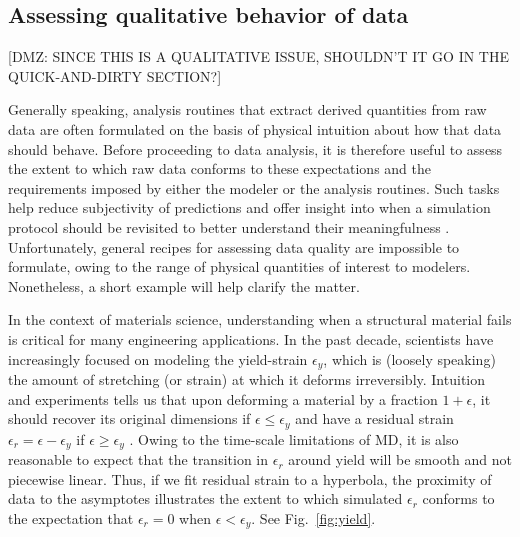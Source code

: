 \subsection{Assessing qualitative behavior of data}

[DMZ: SINCE THIS IS A QUALITATIVE ISSUE, SHOULDN'T IT GO IN THE QUICK-AND-DIRTY SECTION?]

Generally speaking, analysis routines that extract derived quantities from raw data are often formulated on the basis of physical intuition about how that data should behave.  Before proceeding to data analysis, it is therefore useful to assess the extent to which raw data conforms to these expectations and the requirements imposed by either the modeler or the analysis routines.  Such tasks help reduce subjectivity of predictions and offer insight into when a simulation protocol should be revisited to better understand their meaningfulness \cite{patrone1}.  Unfortunately, general recipes for assessing data quality are impossible to formulate, owing to the range of physical quantities of interest to modelers.  Nonetheless, a short example will help clarify the matter.

In the context of materials science, understanding when a structural material fails is critical for many engineering applications.  In the past decade, scientists have increasingly focused on modeling the yield-strain $\epsilon_y$, which is (loosely speaking) the amount of stretching (or strain) at which it deforms irreversibly.  Intuition and experiments tells us that upon deforming a material by a fraction $1+\epsilon$, it should recover its original dimensions if $\epsilon \le \epsilon_y$ and have a residual strain $\epsilon_r = \epsilon - \epsilon_y$ if $\epsilon \ge \epsilon_y$ \cite{patrone2}.  Owing to the time-scale limitations of MD, it is also reasonable to expect that the transition in $\epsilon_r$ around yield will be smooth and not piecewise linear.  Thus, if we fit residual strain to a hyperbola, the proximity of data to the asymptotes illustrates the extent to which simulated $\epsilon_r$ conforms to the expectation that $\epsilon_r=0$ when $\epsilon < \epsilon_y$.  See Fig.~\ref{fig:yield}.

